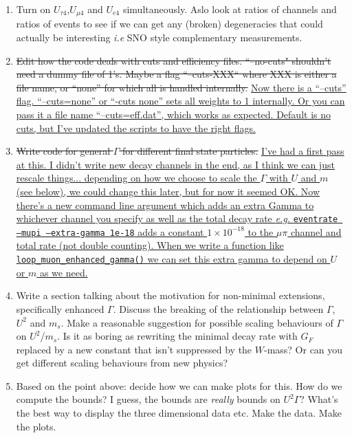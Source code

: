 \documentclass[11pt, a4paper]{article}
\newcommand{\newtext}[2]{\textcolor{#1}{\ul{#2}}}
\begin{document}
\begin{enumerate}
\item Turn on $U_{\tau 4}$,$U_{\mu 4}$ and $U_{e4}$ simultaneously. Aslo look
at ratios of channels and ratios of events to see if we can get any (broken)
degeneracies that could actually be interesting \emph{i.e} SNO style
complementary measurements.

\item \sout{Edit how the code deals with cuts and efficiency files.
``--no-cuts" shouldn't need a dummy file of 1's. Maybe a flag ``--cuts-XXX``
where XXX is either a file name, or ``none'' for which all is handled
internally.} \newtext{PB}{Now there is a ``--cuts'' flag. ``--cuts=none'' or
``-cuts none'' sets all weights to 1 internally. Or you can pass it a file name
``--cuts=eff.dat'', which works as expected. Default is no cuts, but I've
updated the scripts to have the right flags.}

\item \sout{Write code for general $\Gamma$ for different final state
particles.} \newtext{PB}{I've had a first pass at this. I didn't write new
decay channels in the end, as I think we can just rescale things...  depending
on how we choose to scale the $\Gamma$ with $U$ and $m$ (see below), we could
change this later, but for now it seemed OK. Now there's a new command
line argument which adds an extra Gamma to whichever channel you specify as well 
as the total decay rate \emph{e.g.} \texttt{eventrate --mupi --extra-gamma 1e-18}
adds a constant $1\times10^{-18}$ to the $\mu\pi$ channel and total rate (not
double counting). When we write a function like \texttt{loop\_muon\_enhanced\_gamma()} we 
can set this extra gamma to depend on $U$ or $m$ as we need.} 

\item Write a section talking about the motivation for non-minimal extensions,
specifically enhanced $\Gamma$. Discuss the breaking of the relationship
between $\Gamma$, $U^2$ and $m_s$.  Make a reasonable suggestion for possible
scaling behaviours of $\Gamma$ on $U^2$/$m_s$. Is it as boring as rewriting the
minimal decay rate with $G_F$ replaced by a new constant that isn't suppressed
by the $W$-mass? Or can you get different scaling behaviours from new physics?

\item Based on the point above: decide how we can make plots for this. How do
we compute the bounds? I guess, the bounds are \emph{really} bounds on
$U^2\Gamma$? What's the best way to display the three dimensional data etc.
Make the data. Make the plots.


\end{enumerate}
\end{document}
